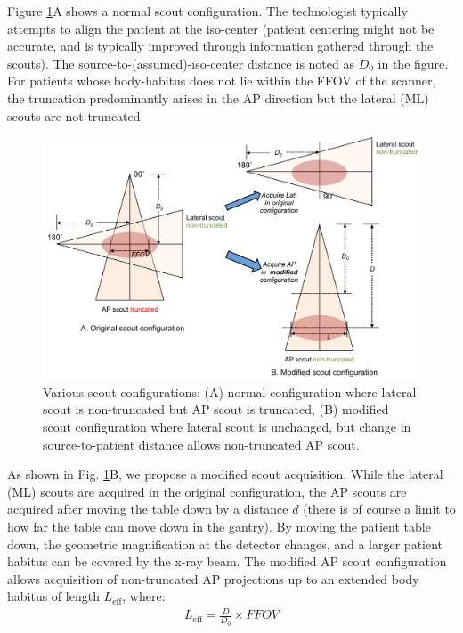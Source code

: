 \documentclass[]{spie}
\begin{document}
Figure \ref{fig:scout_configurations}A shows a normal scout configuration. The technologist typically attempts to align the patient at the iso-center (patient centering might not be accurate, and is typically improved through information gathered through the scouts). The source-to-(assumed)-iso-center distance is noted as $D_0$ in the figure. For  patients whose body-habitus does not lie within the FFOV of the scanner, the truncation predominantly arises in the AP direction but the lateral (ML) scouts are not truncated. 

\begin{figure}[hbtp]
\centering
\includegraphics[width=15 cm]{fig-geometry}
\caption{Various scout configurations: (A) normal configuration where lateral scout is non-truncated but AP scout is truncated, (B) modified scout configuration where lateral scout is unchanged, but change in source-to-patient distance allows non-truncated AP scout. \label{fig:scout_configurations}
}
\end{figure}

As shown in Fig. \ref{fig:scout_configurations}B, we propose a modified scout acquisition. While the lateral (ML) scouts are acquired in the original configuration, the AP scouts are acquired after moving the table down by a distance $d$ (there is of course a limit to how far the table can move down in the gantry). By moving the patient table down, the geometric magnification at the detector changes, and a larger patient habitus can be covered by the x-ray beam. The modified AP scout configuration allows acquisition of non-truncated AP projections up to an extended body habitus of length $L_{\mathrm{eff}}$, where:
\begin{align}
L_{\mathrm{eff}} = \frac{D}{D_0}\times FFOV
\end{align}
\end{document}
